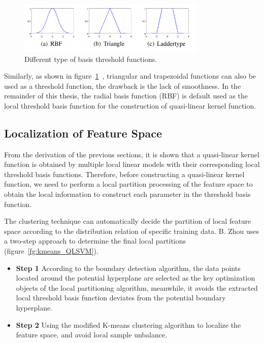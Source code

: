 \documentclass[master]{IPSstyle}
\begin{document}
{\begin{figure}
    \centering
    \includegraphics[width=0.8\textwidth]{figures/ch2_basis_function_types.png}
    \caption{Different type of basis threshold functions.}
    \label{fg:basis_function_types}
\end{figure}
Similarly, as shown in figure~\ref{fg:basis_function_types}~\cite{bo2014quasi}, triangular and trapezoidal functions can also be used as a threshold function, the drawback is the lack of smoothness. In the remainder of this thesis, the radial basis function (RBF) is default used as the local threshold basis function for the construction of quasi-linear kernel function.

\subsection{Localization of Feature Space}
From the derivation of the previous sections, it is shown that a quasi-linear kernel function is obtained by multiple local linear models with their corresponding local threshold basis functions. Therefore, before constructing a quasi-linear kernel function, we need to perform a local partition processing of the feature space to obtain the local information to construct each parameter in the threshold basis function.

The clustering technique can automatically decide the partition of local feature space according to the distribution relation of specific training data. B. Zhou uses a two-step approach to determine the final local partitions~\cite{bo2014quasi} (figure~\ref{fg:kmeans_QLSVM}).
\begin{itemize}
\item \textbf{Step 1} According to the boundary detection algorithm, the data points located around the potential hyperplane are selected as the key optimization objects of the local partitioning algorithm, meanwhile, it avoids the extracted local threshold basis function deviates from the potential boundary hyperplane.
\item \textbf{Step 2} Using the modified K-means clustering algorithm to localize the feature space, and avoid local sample unbalance.
\end{itemize}

}
\end{document}
